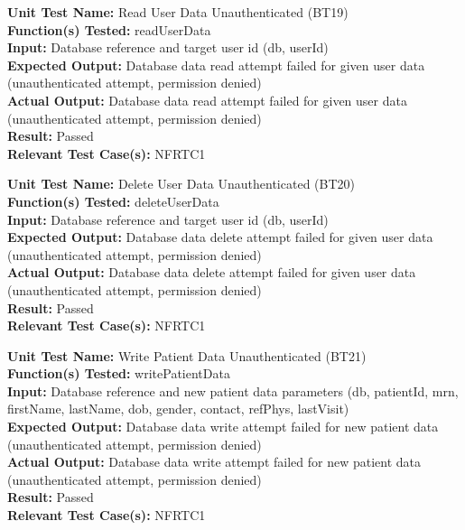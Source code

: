 \documentclass[12pt, titlepage]{article}
\begin{document}
\begin{mdframed}[linewidth=0.5mm]
  \textbf{Unit Test Name:} Read User Data Unauthenticated (BT19) \\
  \textbf{Function(s) Tested:} readUserData \\
  \textbf{Input:} Database reference and target user id (db, userId) \\
  \textbf{Expected Output:} Database data read attempt failed for given user data (unauthenticated attempt, permission denied) \\
  \textbf{Actual Output:} Database data read attempt failed for given user data (unauthenticated attempt, permission denied) \\
  \textbf{Result:} Passed \\
  \textbf{Relevant Test Case(s):} NFRTC1
\end{mdframed}

\begin{mdframed}[linewidth=0.5mm]
  \textbf{Unit Test Name:} Delete User Data Unauthenticated (BT20) \\
  \textbf{Function(s) Tested:} deleteUserData \\
  \textbf{Input:} Database reference and target user id (db, userId) \\
  \textbf{Expected Output:} Database data delete attempt failed for given user data (unauthenticated attempt, permission denied) \\
  \textbf{Actual Output:} Database data delete attempt failed for given user data (unauthenticated attempt, permission denied) \\
  \textbf{Result:} Passed \\
  \textbf{Relevant Test Case(s):} NFRTC1
\end{mdframed}

\begin{mdframed}[linewidth=0.5mm]
  \textbf{Unit Test Name:} Write Patient Data Unauthenticated (BT21) \\
  \textbf{Function(s) Tested:} writePatientData \\
  \textbf{Input:} Database reference and new patient data parameters (db, patientId, mrn, firstName, lastName, dob, gender, contact, refPhys, lastVisit) \\
  \textbf{Expected Output:} Database data write attempt failed for new patient data (unauthenticated attempt, permission denied) \\
  \textbf{Actual Output:} Database data write attempt failed for new patient data (unauthenticated attempt, permission denied) \\
  \textbf{Result:} Passed \\
  \textbf{Relevant Test Case(s):} NFRTC1
\end{mdframed}
\end{document}
